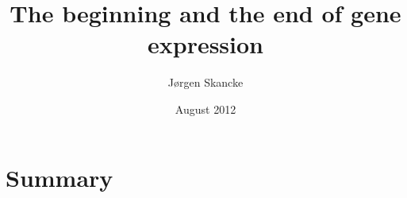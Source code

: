 \documentclass[]{ntnuthesis}
\title{The beginning and the end of gene expression}
\author{Jørgen Skancke}
\date{August 2012}
\begin{document}
 

\frontmatter

\maketitle

\chapter*{Summary}
\noindent
    
\clearpage


%


%


%
%
%
\end{document}
